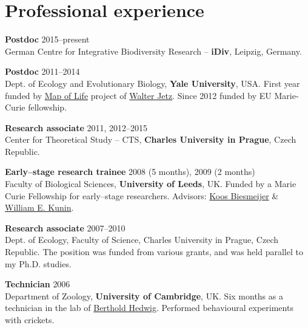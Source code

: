\HRule

\section{Professional experience}

\begin{innerlist}

\item[]{\bf Postdoc} 
\hfill {2015--present} \\
German Centre for Integrative Biodiversity Research -- \textbf{iDiv}, Leipzig, Germany.\\

\item[]{\bf Postdoc} 
\hfill {2011--2014} \\
Dept. of Ecology and Evolutionary Biology, {\bf Yale University}, USA. First year funded by \href{http://www.mappinglife.org/}{Map of Life} project of \href{http://jetzlab.yale.edu/people/walter-jetz}{Walter Jetz}. Since 2012 funded by EU Marie-Curie fellowship.\\

\item[]{\bf Research associate} 
\hfill {2011, 2012--2015} \\ 
Center for Theoretical Study -- CTS, {\bf Charles University in Prague}, Czech Republic. \\

\item[]{\bf Early--stage research trainee} 
\hfill {2008 (5 months), 2009 (2 months)} \\ 
Faculty of Biological Sciences, {\bf University of Leeds}, UK. 
Funded by a Marie Curie Fellowship for early--stage researchers. Advisors: \href{http://www.fbs.leeds.ac.uk/staff/profile.php?tag=Biesmeijer}{Koos Biesmeijer} \& \href{http://www.fbs.leeds.ac.uk/staff/profile.php?tag=Kunin}{William E. Kunin}.\\

\item[]{\bf Research associate} 
\hfill {2007--2010} \\ 
Dept. of Ecology, Faculty of Science, Charles University in Prague, Czech Republic. The position was funded from various grants, and was held parallel to my Ph.D. studies.\\

\item[]{\bf Technician}
\hfill {2006}\\
Department of Zoology, {\bf University of Cambridge}, UK. Six months as a technician in the lab of \href{http://www.zoo.cam.ac.uk/zoostaff/hedwig/index.html}{Berthold Hedwig}. Performed behavioural experiments with crickets.\\\\\\\\

\end{innerlist}

